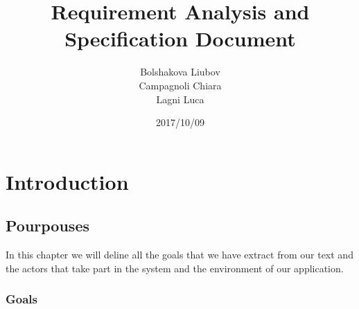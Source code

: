 \documentclass[a4paper]{book}
\begin{document}
\date{2017/10/09}
\author{Bolshakova Liubov\\ Campagnoli Chiara\\ Lagni Luca}
\title{Requirement Analysis and Specification Document}
\frontmatter                            %
\maketitle                              %
\tableofcontents                        %
\mainmatter   

\part{Introduction}

\chapter{Pourpouses}
In this chapter we will deline all the goals that we have extract from our text and the actors that take part
in the system and the environment of our application.

\section{Goals}
\end{document}
